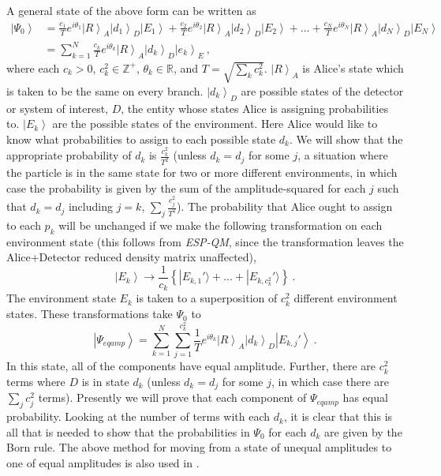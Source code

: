 \documentclass[12pt,onecolumn,secnumarabic,amsmath,amssymb,balancelastpage,nofootinbib]{article}
\newcommand{\ket}[1]{\ensuremath{\left|#1\right\rangle}}
\begin{document}
A general state of the above form can be written as
\begin{align}
\ket{\Psi_0}&= \frac{c_1}{T}e^{i\theta_1}\ket{R}_A\ket{d_1}_D\ket{E_1}+\frac{c_2}{T}e^{i\theta_2}\ket{R}_A\ket{d_2}_D\ket{E_2}+...+\frac{c_N}{T}e^{i\theta_N}\ket{R}_A\ket{d_N}_D\ket{E_N}
\nonumber
\\
&= \sum_{k=1}^N{\frac{c_k}{T}e^{i\theta_k}\ket{R}_A\ket{d_k}_D\ket{e_k}_E}\ ,
\label{}
\end{align}
where each $c_k>0$, $c_k^2\in\mathbb{Z}^+$, $\theta_k\in\mathbb{R}$, and $T=\sqrt{\sum_k{c_k^2}}$.  $\ket{R}_A$ is Alice's state which is taken to be the same on every branch.  $\ket{d_k}_D$ are possible states of the detector or system of interest, $D$, the entity whose states Alice is assigning probabilities to.  $\ket{E_k}$ are the possible states of the environment.  Here Alice would like to know what probabilities to assign to each possible state $d_k$.  We will show that the appropriate probability of $d_k$ is $\frac{c_k^2}{T^2}$ (unless $d_k=d_j$ for some $j$, a situation where the particle is in the same state for two or more different environments, in which case the probability is given by the sum of the amplitude-squared for each $j$ such that $d_k=d_j$ including $j=k$, $\sum_j\frac{c_j^2}{T^2}$).  The probability that Alice ought to assign to each $p_k$ will be unchanged if we make the following transformation on each environment state (this follows from \emph{ESP-QM}, since the transformation leaves the Alice+Detector reduced density matrix unaffected),
\begin{equation}
\ket{E_k}\longrightarrow\frac{1}{c_k}\left\{|E_{k,1}'\rangle+...+|E_{k,c_k^2}'\rangle\right\}\ .
\label{}
\end{equation}
The environment state $E_k$ is taken to a superposition of $c_k^2$ different environment states.
These transformations take $\Psi_0$ to
\begin{equation}
\ket{\Psi_{eqamp}}=\sum_{k=1}^N{\sum_{j=1}^{c_k^2}\frac{1}{T}e^{i\theta_k}\ket{R}_A\ket{d_k}_D\ket{E_{k,j}'}}\ .
\label{eqamp}
\end{equation}
In this state, all of the components have equal amplitude.  Further, there are $c_k^2$ terms where $D$ is in state $d_k$ (unless $d_k=d_j$ for some $j$, in which case there are $\sum_j c_j^2$ terms).  Presently we will prove that each component of $\Psi_{eqamp}$ has equal probability.  Looking at the number of terms with each $d_k$, it is clear that this is all that is needed to show that the probabilities in $\Psi_0$ for each $d_k$ are given by the Born rule.  The above method for moving from a state of unequal amplitudes to one of equal amplitudes is also used in \citep[\textsection II.D]{zurek2005}.
\end{document}
